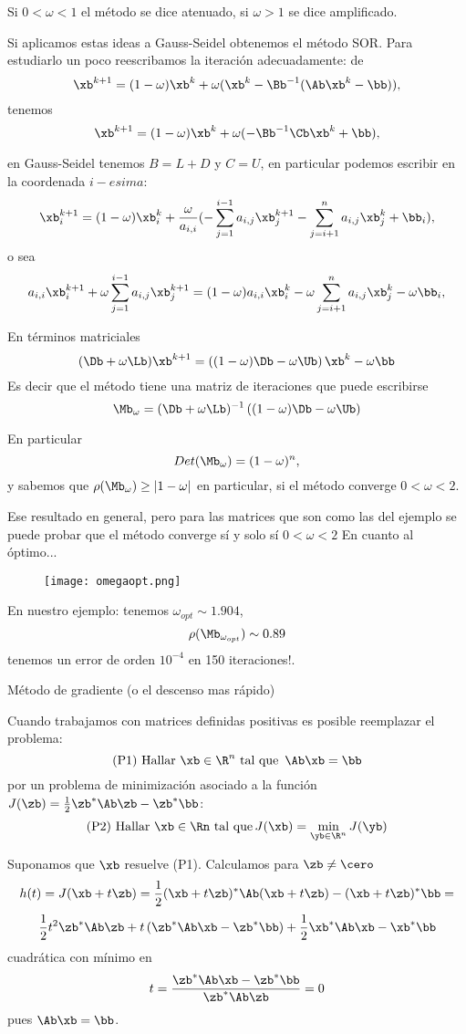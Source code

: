 Si $0<\omega<1$ el método se dice atenuado, si $\omega>1$ se dice amplificado.

Si aplicamos estas ideas a Gauss-Seidel obtenemos el método SOR. Para estudiarlo un poco reescribamos la iteración adecuadamente: de
$$
\xb^{k+1}=(1-\omega)\xb^k+
\omega(\xb^k-\Bb^{-1}(\Ab\xb^k-\bb)),
$$
tenemos
$$
\xb^{k+1}=(1-\omega)\xb^k+
\omega(-\Bb^{-1}\Cb\xb^k+\bb),
$$

en Gauss-Seidel tenemos $B=L+D$ y $C=U$, en particular podemos escribir en la coordenada $i-esima$:
$$
\xb^{k+1}_i=(1-\omega)\xb^k_i+
\frac{\omega}{a_{i,i}}(-\sum_{j=1}^{i-1}a_{i,j}\xb_j^{k+1}-\sum_{j=i+1}^{n}a_{i,j}\xb_j^k+\bb_i),
$$
o sea
$$
a_{i,i}\xb^{k+1}_i+\omega\sum_{j=1}^{i-1}a_{i,j}\xb_j^{k+1}=(1-\omega)a_{i,i}\xb^k_i-
\omega\sum_{j=i+1}^{n}a_{i,j}\xb_j^k -\omega\bb_i,
$$

En términos matriciales
$$
(\Db+\omega \Lb)\xb^{k+1}=\left((1-\omega)\Db-\omega\Ub\right)\xb^{k}-\omega \bb
$$
Es decir que el método tiene una matriz de iteraciones que puede escribirse
$$
\Mb_\omega=(\Db+\omega \Lb)^{-1}\left((1-\omega)\Db-\omega\Ub\right)
$$

En particular
$$
Det (\Mb_\omega)=(1-\omega)^n,
$$
y sabemos que
$\rho(\Mb_\omega)\ge |1-\omega|$
en particular, si el m\'etodo converge
$0<\omega<2$.

Ese resultado en general, pero para las matrices que son como las del ejemplo se puede probar que el método converge sí y solo sí
$0<\omega<2$
En cuanto al óptimo...
\begin{figure}[h]
\centering\texttt{[image: omegaopt.png]}
\end{figure}


En nuestro ejemplo:
tenemos $\omega_{opt}\sim 1.904$,
$$
\rho(\Mb_{\omega_{opt}})\sim 0.89
$$
tenemos un error de orden $10^{-4}$ en 150 iteraciones!.


Método de gradiente (o el descenso mas rápido)

Cuando trabajamos con matrices definidas positivas es posible reemplazar el problema:
$$
\mbox{(P1) Hallar $\xb\in \R^n$ tal que
}\,\Ab\xb=\bb
$$
por un problema de minimización  asociado a la función $J(\zb)=\frac{1}{2}\zb^*\Ab\zb-\zb^*\bb$:
$$
\mbox{(P2) Hallar $\xb\in \Rn$ tal que}\, J(\xb)=
\min_{\yb\in \R^n}J(\yb)
$$

Suponamos que $\xb$ resuelve (P1). Calculamos para $\zb\ne\cero$
$$
h(t)=J(\xb+t\zb)= \frac{1}{2}(\xb+t\zb)^*\Ab(\xb+t\zb)-(\xb+t\zb)^*\bb=
$$
$$
\frac{1}{2}t^2\zb^*\Ab\zb+t\left(\zb^*\Ab\xb-\zb^*\bb\right) +\frac{1}{2}\xb^*\Ab\xb-\xb^*\bb
$$
cuadr\'atica con mínimo en
$$
t=\frac{\zb^*\Ab\xb-\zb^*\bb}{\zb^*\Ab\zb}=0
$$
pues $\Ab\xb=\bb$.


